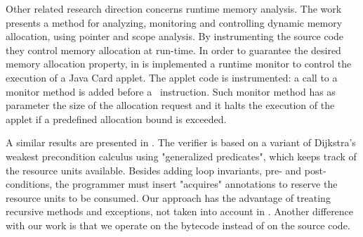 Other related research direction concerns runtime memory analysis. The work \cite{GNYZ04pir} presents a method for analyzing, monitoring and controlling dynamic memory allocation, using pointer and scope analysis. By instrumenting the source code they control memory allocation at run-time. In order to guarantee the desired memory allocation property, in \cite{fredlund04gcp} is implemented a runtime monitor to control the execution of a Java Card applet. The applet code is instrumented: a call to a monitor method is added before a \new\ instruction. Such monitor method has as parameter the size of the allocation request and it halts the execution of the applet if a predefined allocation bound is exceeded. 


A similar results are presented in  \cite{ChanderEILN05}. The verifier is based on a variant of Dijkstra's
weakest precondition calculus using "generalized predicates", which keeps
track of the resource units available. Besides adding loop invariants,
pre- and post-conditions, the programmer must insert "acquires"
annotations to reserve the resource units to be consumed. Our approach has
the advantage of treating recursive methods and exceptions, not taken into
account in \cite{ChanderEILN05}. Another difference with our work is that we
operate on the bytecode instead of on the source code.



